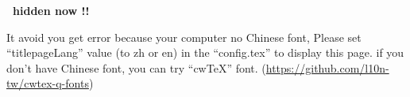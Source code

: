 \documentclass[class=NCU_thesis, crop=false]{standalone}
\begin{document}
\fontsize{16}{25}\selectfont
\sffamily %
\begin{titlepage}
    \vspace*{30mm}
    \begin{center}
        {\Huge\textbf{\thispage\ hidden now !!}\par}
    \end{center}
    \vspace*{30mm}
    {\Huge 
    It avoid you get error because your computer no Chinese font, 
    Please set ``titlepageLang'' value (to zh or en) in the ``config.tex'' to display this page.
    if you don't have Chinese font, you can try ``cwTeX'' font. 
    (\url{https://github.com/l10n-tw/cwtex-q-fonts})\par}
    \null\vfill
\end{titlepage}
\restoregeometry
\rmfamily %
\cleardoublepage
\end{document}
